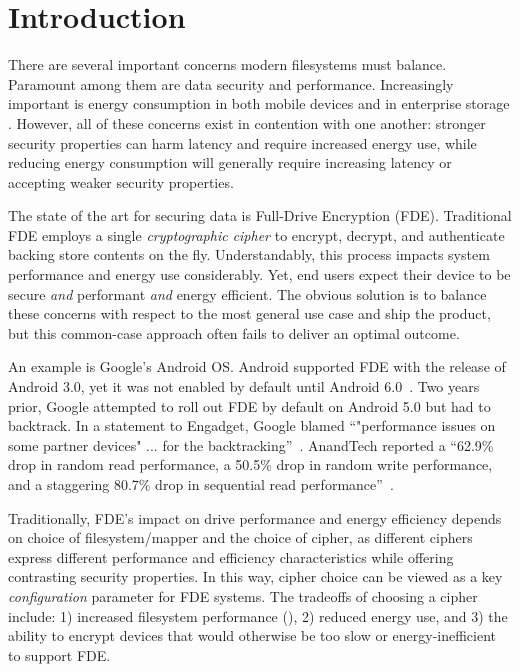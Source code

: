 \section{Introduction}\label{sec:introduction}

There are several important concerns modern filesystems must balance. Paramount
among them are data security and performance. Increasingly important is energy
consumption in both mobile devices \cite{android-M-mobile-motivation} and in
enterprise storage \cite{enterprise-motivation}. However, all of these concerns
exist in contention with one another: stronger security properties can harm
latency and require increased energy use, while reducing energy consumption will
generally require increasing latency or accepting weaker security properties.

The state of the art for securing data is Full-Drive Encryption (FDE).
Traditional FDE employs a single \emph{cryptographic cipher} to encrypt,
decrypt, and authenticate backing store contents on the fly. Understandably,
this process impacts system performance and energy use considerably. Yet, end
users expect their device to be secure \emph{and} performant \emph{and} energy
efficient. The obvious solution is to balance these concerns with respect to the
most general use case and ship the product, but this common-case approach often
fails to deliver an optimal outcome.

An example is Google's Android OS. Android supported FDE with the release of
Android 3.0, yet it was not enabled by default until Android
6.0~\cite{android-M-mobile-motivation}. Two years prior, Google attempted to
roll out FDE by default on Android 5.0 but had to backtrack. In a statement to
Engadget, Google blamed ``"performance issues on some partner devices" ... for
the backtracking''~\cite{google-engadget}. AnandTech reported a ``62.9\% drop in
random read performance, a 50.5\% drop in random write performance, and a
staggering 80.7\% drop in sequential read
performance''~\cite{android-M-mobile-motivation-2}.

Traditionally, FDE's impact on drive performance and energy efficiency depends
on choice of filesystem/mapper and the choice of cipher, as different ciphers
express different performance and efficiency characteristics while offering
contrasting security properties. In this way, cipher choice can be viewed as a
key \emph{configuration} parameter for FDE systems. The tradeoffs of choosing
a cipher include: 1) increased filesystem performance (), 2) reduced energy use, and 3) the ability to encrypt devices that
would otherwise be too slow or energy-inefficient to support FDE.

